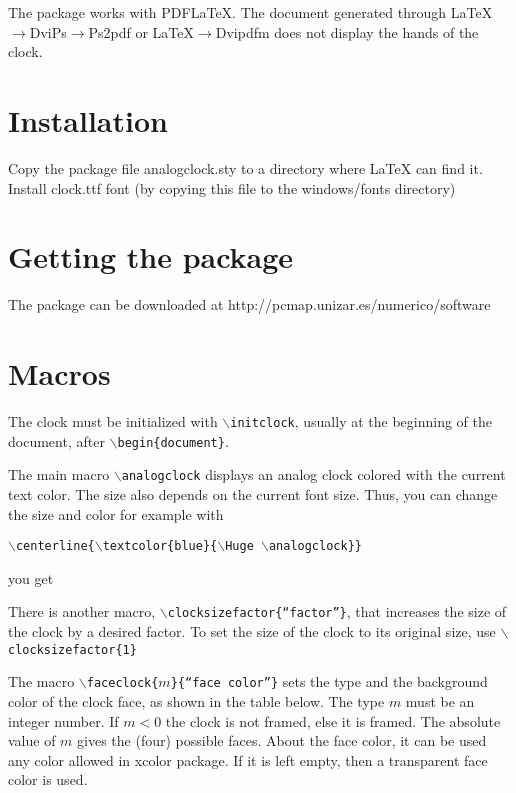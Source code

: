 \documentclass[12pt]{article}
\begin{document}
The package works with PDF\LaTeX\/.  The document generated through \LaTeX\/$\to$DviPs$\to$Ps2pdf or 
\LaTeX\/$\to$Dvipdfm does not display the hands of the clock.

\section{Installation}
Copy the package file analogclock.sty to a directory where \LaTeX\/ can find it.
Install clock.ttf font (by copying this file to the windows/fonts directory)

\section{Getting the package}

The package can be downloaded at  http://pcmap.unizar.es/numerico/software

\section{Macros}

The clock must be initialized with  \texttt{$\backslash$initclock}, usually at the beginning of the document, after 
\texttt{$\backslash$begin\{document\}}.

The main macro \texttt{$\backslash$analogclock} displays an analog clock colored with the current text color.
The size also depends on the current font size.  Thus, you can change the size and color for example with

\texttt{$\backslash$centerline\{$\backslash$textcolor\{blue\}\{$\backslash$Huge $\backslash$analogclock\}\}}

you get

\centerline{\textcolor{blue}{\Huge \analogclock}}

There is another macro,  \texttt{$\backslash$clocksizefactor\{``factor''\}}, that increases the size of the clock
by a desired factor.  To set the size of the clock to its original size, use
\texttt{$\backslash$clocksizefactor\{1\}}

The macro \texttt{$\backslash$faceclock\{$m$\}\{``face color''\}} sets the type and the background color of the clock face, as shown in the table below. The type $m$ must be an integer number.  If $m<0$ the clock is not framed, else it is framed.  The absolute value of $m$ gives the  (four) possible faces.  About the face color, it can be used any color allowed in xcolor package.  If it is left empty, then a transparent face color is used.
\end{document}
